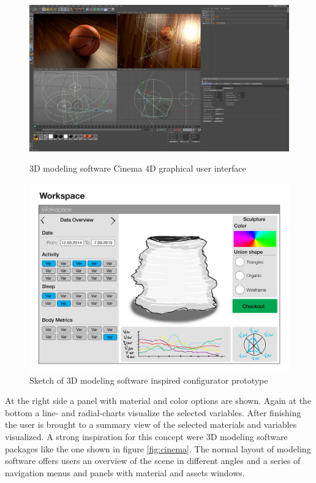 \documentclass[../medieninformatik-arbeit.tex]{subfiles}
\begin{document}
\begin{figure}[hb]
\centering
\begin{minipage}{.45\textwidth}
\centering
  \includegraphics[width=1.06\textwidth,trim=0mm 0mm 50mm 0mm,clip=true]{Prototype/img/cinema4d}
  \caption{3D modeling software Cinema 4D graphical user interface\ \cite{cinema4d}}
  \label{fig:cinema}
\end{minipage}
\begin{minipage}{.45\textwidth}
\centering
  \includegraphics[width=1.0\linewidth,trim=0mm 0mm 0mm 28mm,clip=true]{Prototype/img/ui_proto2}
  \caption{Sketch of 3D modeling software inspired configurator prototype}
  \label{fig:uiproto2}
\end{minipage}
\end{figure}

At the right side a panel with material and color options are shown. Again at the bottom a line- and radial-charts visualize the selected variables. After finishing the user is brought to a summary view of the selected materials and variables visualized. A strong inspiration for this concept were 3D modeling software packages like the one shown in figure \ref{fig:cinema}. The normal layout of modeling software offers users an overview of the scene in different angles and a series of navigation menus and panels with material and assets windows. 
\end{document}

